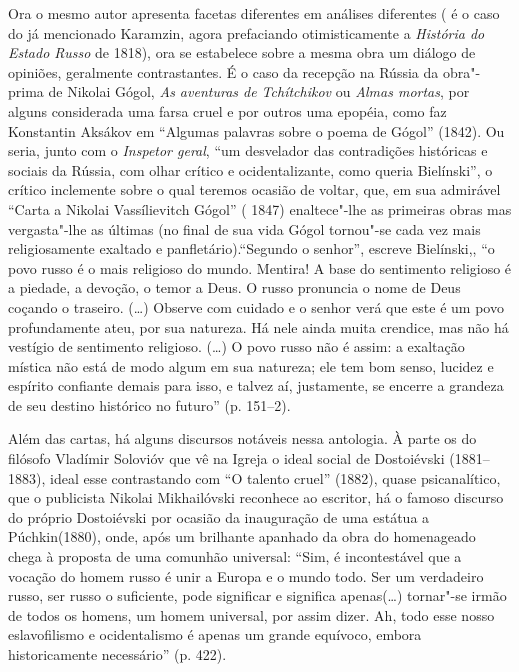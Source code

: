 Ora o mesmo autor apresenta facetas diferentes em análises diferentes (
é o caso do já mencionado Karamzin, agora prefaciando otimisticamente a
\emph{História do Estado Russo} de 1818), ora se estabelece sobre a
mesma obra um diálogo de opiniões, geralmente contrastantes. É o caso da
recepção na Rússia da obra"-prima de Nikolai Gógol, \emph{As aventuras de Tchítchikov} ou \emph{Almas mortas}, por alguns considerada uma
farsa cruel e por outros uma epopéia, como faz Konstantin Aksákov em
``Algumas palavras sobre o poema de Gógol'' (1842). Ou seria, junto com
o \emph{Inspetor geral}, ``um desvelador das contradições históricas e
sociais da Rússia, com olhar crítico e ocidentalizante, como queria
Bielínski'', o crítico inclemente sobre o qual teremos ocasião de
voltar, que, em sua admirável ``Carta a Nikolai Vassílievitch Gógol'' (
1847) enaltece"-lhe as primeiras obras mas vergasta"-lhe as últimas (no
final de sua vida Gógol tornou"-se cada vez mais religiosamente exaltado
e panfletário).``Segundo o senhor'', escreve Bielínski,, ``o povo russo
é o mais religioso do mundo. Mentira! A base do sentimento religioso é a
piedade, a devoção, o temor a Deus. O russo pronuncia o nome de Deus
coçando o traseiro. (\ldots{}) Observe com cuidado e o senhor verá que este é
um povo profundamente ateu, por sua natureza. Há nele ainda muita
crendice, mas não há vestígio de sentimento religioso. (\ldots{}) O povo
russo não é assim: a exaltação mística não está de modo algum em sua
natureza; ele tem bom senso, lucidez e espírito confiante demais para
isso, e talvez aí, justamente, se encerre a grandeza de seu destino
histórico no futuro'' (p. 151--2).

Além das cartas, há alguns discursos notáveis nessa antologia. À parte
os do filósofo Vladímir Solovióv que vê na Igreja o ideal social de
Dostoiévski (1881--1883), ideal esse contrastando com ``O talento
cruel'' (1882), quase psicanalítico, que o publicista Nikolai Mikhailóvski reconhece
ao escritor, há o famoso discurso do próprio Dostoiévski por ocasião da
inauguração de uma estátua a Púchkin(1880), onde, após um brilhante
apanhado da obra do homenageado chega à proposta de uma comunhão
universal: ``Sim, é incontestável que a vocação do homem russo é unir a
Europa e o mundo todo. Ser um verdadeiro russo, ser russo o suficiente,
pode significar e significa apenas(\ldots{}) tornar"-se irmão de todos os
homens, um homem universal, por assim dizer. Ah, todo esse nosso
eslavofilismo e ocidentalismo é apenas um grande equívoco, embora
historicamente necessário'' (p. 422).

